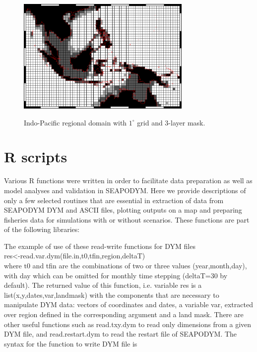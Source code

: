\begin{figure}[t]
   \centering
    \vbox{
    \includegraphics[width=0.75\textwidth]{annexes/figs/Grid-mask}\\
   }
   \caption{{\bfseries} Indo-Pacific regional domain with $1^{\circ}$ grid and 3-layer mask.}
   \label{fig:domain}
 \end{figure}

\section{R scripts}\label{sec:r-tools}

Various R functions were written in order to facilitate data preparation as well as model analyses and validation in SEAPODYM. Here we provide descriptions of only a few selected routines that are essential in extraction of data from SEAPODYM DYM and ASCII files, plotting outputs on a map and preparing fisheries data for simulations with or without scenarios. These functions are part of the following libraries:

\setlength\parindent{2cm}
 
\vspace{0.5cm}

\noindent The example of use of these read-write functions for DYM files \\ 

{\ttfamily  res<-read.var.dym(file.in,t0,tfin,region,deltaT) }\\

\noindent where {\ttfamily t0} and {\ttfamily tfin} are the combinations of two or three values {\ttfamily (year,month,day)}, with {\ttfamily day} which can be omitted for monthly time stepping ({\ttfamily deltaT=30} by default). The returned value of this function, i.e. variable {\ttfamily res} is a {\ttfamily list(x,y,dates,var,landmask)} with the components that are necessary to manipulate DYM data: vectors of coordinates and dates, a variable {\ttfamily var}, extracted over region defined in the corresponding argument and a land mask. There are other useful functions such as {\ttfamily read.txy.dym}  to read only dimensions from a given DYM file, and {\ttfamily read.restart.dym} to read the restart file of SEAPODYM. The syntax for the function to write DYM file is\\

